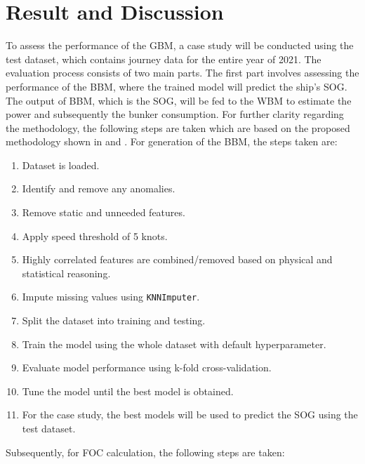 \chapter{Result and Discussion} \label{chp:result_and_discussion}

To assess the performance of the GBM, a case study will be conducted using the test dataset, which contains journey data for the entire year of 2021. The evaluation process consists of two main parts. The first part involves assessing the performance of the BBM, where the trained model will predict the ship's SOG. The output of BBM, which is the SOG, will be fed to the WBM to estimate the power and subsequently the bunker consumption. For further clarity regarding the methodology, the following steps are taken which are based on the proposed methodology shown in  and . For generation of the BBM, the steps taken are:

\begin{enumerate}
    \setlength\itemsep{0em}
    \item Dataset is loaded.
    \item Identify and remove any anomalies.
    \item Remove static and unneeded features.
    \item Apply speed threshold of 5 knots.
    \item Highly correlated features are combined/removed based on physical and statistical reasoning.
    \item Impute missing values using {\tt KNNImputer}.
    \item Split the dataset into training and testing.
    \item Train the model using the whole dataset with default hyperparameter.
    \item Evaluate model performance using k-fold cross-validation.
    \item Tune the model until the best model is obtained.
    \item For the case study, the best models will be used to predict the SOG using the test dataset.
\end{enumerate}

Subsequently, for FOC calculation, the following steps are taken:

